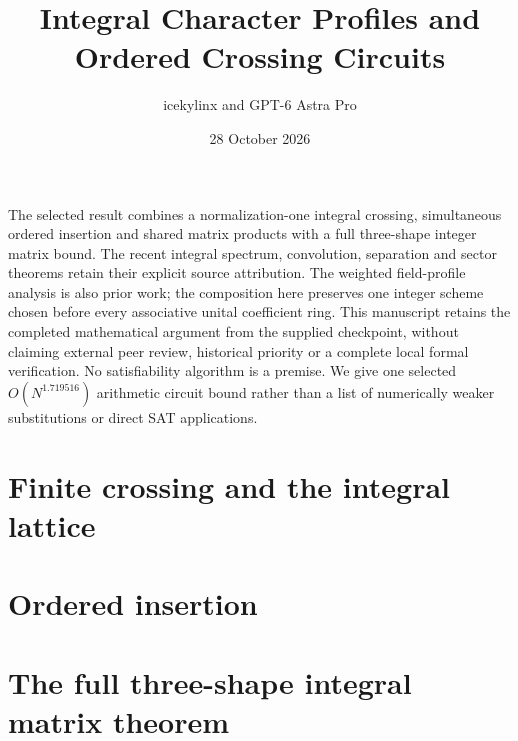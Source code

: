 \documentclass[11pt]{article}
\title{Integral Character Profiles and Ordered Crossing Circuits}
\author{icekylinx and GPT-6 Astra Pro}
\date{28 October 2026}
\begin{document}
\maketitle
The selected result combines a normalization-one integral crossing,
simultaneous ordered insertion and shared matrix products with a full
three-shape integer matrix bound. The recent integral spectrum,
convolution, separation and sector theorems retain their explicit source
attribution. The weighted field-profile analysis is also prior work;
the composition here preserves one integer scheme chosen before every
associative unital coefficient ring. This manuscript retains the completed
mathematical argument from the supplied checkpoint, without claiming
external peer review, historical priority or a complete local formal
verification. No satisfiability algorithm is a premise. We give one
selected $O(N^{1.719516})$ arithmetic circuit bound rather than a list
of numerically weaker substitutions or direct SAT applications.
\tableofcontents
\section{Finite crossing and the integral lattice}



\section{Ordered insertion}

\section{The full three-shape integral matrix theorem}




\end{document}
